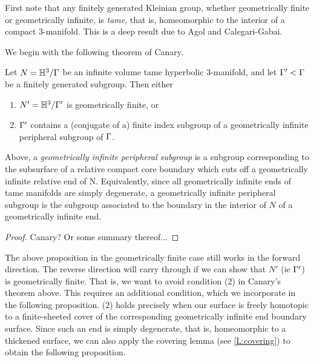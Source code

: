 First note that any finitely generated Kleinian group, whether geometrically
finite or geometrically infinite, is \emph{tame}, that is, homeomorphic to the
interior of a compact 3-manifold. This is a deep result due to Agol and
Calegari-Gabai. %

We begin with the following theorem of Canary.

\begin{thm}

Let $N = \mathbb{H}^3/\Gamma$ be an infinite volume tame hyperbolic 3-manifold, and let
$\Gamma' < \Gamma$ be a finitely generated subgroup. Then either

\begin{enumerate}

\item $N' = \mathbb{H}^3 / \Gamma'$ is geometrically finite, or

\item $\Gamma'$ contains a (conjugate of a) finite index subgroup of
a geometrically infinite peripheral subgroup of $\Gamma$.

\end{enumerate}

Above, a \emph{geometrically infinite peripheral subgroup} is a subgroup
corresponding to the subsurface of a relative compact core boundary which cuts
off a geometrically infinite relative end of N. Equivalently, since all
geometrically infinite ends of tame manifolds are simply degenerate,
a geometrically infinite peripheral subgroup is the subgroup associated to the
boundary in the interior of $N$ of a geometrically infinite end.

\end{thm}

\begin{proof}

Canary? Or some summary thereof... %

\end{proof}

The above proposition in the geometrically finite case still works in the
forward direction. The reverse direction will carry through if we can show that
$N'$ (ie $\Gamma'$) is geometrically finite. That is, we want to avoid condition
(2) in Canary's theorem above. This requires an additional condition, which we
incorporate in the following proposition. (2) holds precisely when our surface
is freely homotopic to a finite-sheeted cover of the corresponding
geometrically infinite end boundary surface. Since such an end is simply
degenerate, that is, homeomorphic to a thickened surface, we can also apply the
covering lemma (see \ref{L:covering}) to obtain the following proposition.

